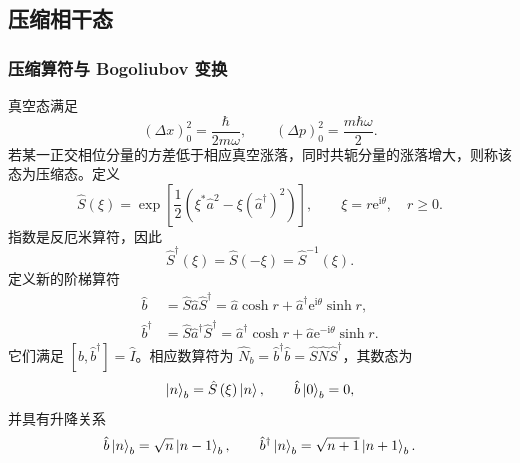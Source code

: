 \subsection{压缩相干态}
\subsubsection{压缩算符与 Bogoliubov 变换}
真空态满足
\begin{equation}
\left(\Delta x\right)_0^2=\frac{\hbar}{2m\omega},
\qquad
\left(\Delta p\right)_0^2=\frac{m\hbar\omega}{2}.
\end{equation}
若某一正交相位分量的方差低于相应真空涨落，同时共轭分量的涨落增大，则称该态为压缩态。定义
\begin{equation}
\hat S\left(\xi\right)
=\exp\left[\frac12\left(\xi^*\hat a^2-\xi\left(\hat a^\dagger\right)^2\right)\right],
\qquad
\xi=r\mathrm{e}^{\mathrm{i}\theta},\quad r\geq0.
\end{equation}
指数是反厄米算符，因此
\begin{equation}
\hat S^\dagger\left(\xi\right)=\hat S\left(-\xi\right)=\hat S^{-1}\left(\xi\right).
\end{equation}
定义新的阶梯算符
\begin{align}
\hat b&=\hat S\hat a\hat S^\dagger
=\hat a\cosh r+\hat a^\dagger\mathrm{e}^{\mathrm{i}\theta}\sinh r,\\
\hat b^\dagger&=\hat S\hat a^\dagger\hat S^\dagger
=\hat a^\dagger\cosh r+\hat a\mathrm{e}^{-\mathrm{i}\theta}\sinh r.
\end{align}
它们满足 $\left[\hat b,\hat b^\dagger\right]=\hat I$。相应数算符为
$\hat N_b=\hat b^\dagger\hat b=\hat S\hat N\hat S^\dagger$，其数态为
\begin{equation}
\Ket{n}_b=\hat S\left(\xi\right)\Ket{n},
\qquad
\hat b\Ket{0}_b=0,
\end{equation}
并具有升降关系
\begin{equation}
\hat b\Ket{n}_b=\sqrt{n}\Ket{n-1}_b,
\qquad
\hat b^\dagger\Ket{n}_b=\sqrt{n+1}\Ket{n+1}_b.
\end{equation}

